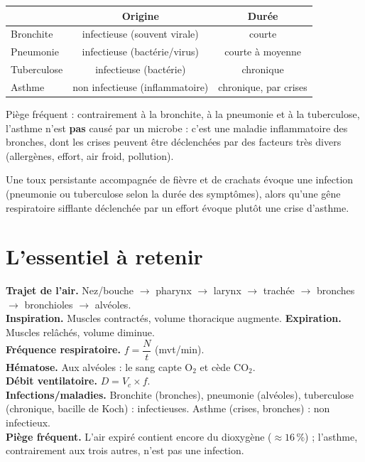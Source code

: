 \begin{propriete}
\begin{center}
\small
\begin{tabular}{lcc}
\toprule
& \textbf{Origine} & \textbf{Durée} \\
\midrule
Bronchite & infectieuse (souvent virale) & courte \\
Pneumonie & infectieuse (bactérie/virus) & courte à moyenne \\
Tuberculose & infectieuse (bactérie) & chronique \\
Asthme & non infectieuse (inflammatoire) & chronique, par crises \\
\bottomrule
\end{tabular}
\end{center}
\end{propriete}

\begin{remarque}
Piège fréquent : contrairement à la bronchite, à la pneumonie et à la tuberculose,
l'asthme n'est \textbf{pas} causé par un microbe : c'est une maladie inflammatoire des
bronches, dont les crises peuvent être déclenchées par des facteurs très divers
(allergènes, effort, air froid, pollution).
\end{remarque}

\begin{exemple}
Une toux persistante accompagnée de fièvre et de crachats évoque une infection
(pneumonie ou tuberculose selon la durée des symptômes), alors qu'une gêne
respiratoire sifflante déclenchée par un effort évoque plutôt une crise d'asthme.
\end{exemple}

\section{L'essentiel à retenir}

\begin{synthese}
\textbf{Trajet de l'air.} Nez/bouche $\to$ pharynx $\to$ larynx $\to$ trachée $\to$
bronches $\to$ bronchioles $\to$ alvéoles.\\[4pt]
\textbf{Inspiration.} Muscles contractés, volume thoracique augmente. \textbf{Expiration.}
Muscles relâchés, volume diminue.\\[4pt]
\textbf{Fréquence respiratoire.} $f=\dfrac Nt$ (mvt/min).\\[4pt]
\textbf{Hématose.} Aux alvéoles : le sang capte $\mathrm{O_2}$ et cède $\mathrm{CO_2}$.\\[4pt]
\textbf{Débit ventilatoire.} $D=V_c\times f$.\\[4pt]
\textbf{Infections/maladies.} Bronchite (bronches), pneumonie (alvéoles), tuberculose
(chronique, bacille de Koch) : infectieuses. Asthme (crises, bronches) : non
infectieux.\\[4pt]
\textbf{Piège fréquent.} L'air expiré contient encore du dioxygène ($\approx16\,\%$) ;
l'asthme, contrairement aux trois autres, n'est pas une infection.
\end{synthese}

